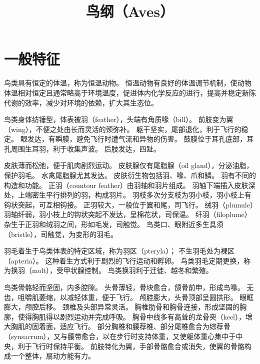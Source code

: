 \documentclass[11pt]{article}
\title{鸟纲（Aves）}
\date{}
\begin{document}
  \maketitle

  \linenumbers

\section{一般特征}
鸟类具有恒定的体温，称为恒温动物。
恒温动物有良好的体温调节机制，使动物体温相对恒定且通常略高于环境温度，促进体内化学反应的进行，提高并稳定新陈代谢的效率，减少对环境的依赖，扩大其生态位。

\newline

鸟类身体纺锤型，体表被羽（feather），头端有角质喙（bill）。
前肢变为翼（wing），不便之处由长而灵活的颈弥补。
躯干坚实，尾部退化，利于飞行的稳定。
眼发达，有瞬膜，避免飞行时遭气流和异物的伤害。
鼓膜位于耳孔底部，耳孔周围生耳羽，利于收集声波。
后肢发达，四趾。

\newline

皮肤薄而松弛，便于肌肉剧烈运动。
皮肤腺仅有尾脂腺（oil gland），分泌油脂，保护羽毛。
水禽尾脂腺尤其发达。
皮肤衍生物包括羽、喙、爪和鳞。
羽有不同的构造和功能。
正羽（countour feather）由羽轴和羽片组成。
羽轴下端插入皮肤深处，上端密生平行排列的羽，构成羽片。
羽枝多次分支枝为羽小枝，羽小枝上有钩状突起，可互相钩接。
正羽较大，一般位于翼和尾，司飞行。
绒羽（plumule）羽轴纤弱，羽小枝上的钩状突起不发达，呈棉花状，司保温。
纤羽（filoplume）杂生于正羽和绒羽之间，形如毛发，司触觉。
鸟类口、眼附近多生具须（bristle），司触觉，为变形的羽毛。

\newline

羽毛着生于鸟类体表的特定区域，称为羽区（pteryla）；
不生羽毛处为裸区（apteria）。
这种着生方式利于剧烈的飞行运动和孵卵。
鸟类羽毛定期更换，称为换羽（molt），受甲状腺控制。
鸟类换羽利于迁徙、越冬和繁殖。

\newline

鸟类骨骼轻而坚固，内多腔隙。
头骨薄轻，骨块愈合，颌骨前申，形成鸟喙。
无齿，咀嚼肌萎缩，以减轻体重，便于飞行。
颅腔膨大，头骨顶部呈圆拱形。
眼眶膨大，颅腔后移。
颈椎及头部异常灵活。
胸椎肋骨和胸骨连接，形成坚固的胸廓，使得胸肌得以剧烈运动并完成呼吸。
胸骨中线多有高耸的龙骨突（keel），增大胸肌的固着面，适应飞行。
部分胸椎和腰荐椎、部分尾椎愈合为综荐骨（synsacrum），又与腰带愈合，以在步行时支持体重，又使躯体重心集中于中央，利于飞行时保持平衡。
前肢特化为翼，手部骨骼愈合或消失，使翼的骨骼构成一个整体，扇动方能有力。
\end{document}
